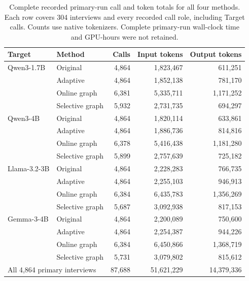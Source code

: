 \documentclass{ieeeaccess}
\begin{document}
\renewcommand{\thetable}{S6b}
\begin{table}[H]
\centering
\footnotesize
\caption{Complete recorded primary-run call and token totals for all four methods. Each row covers 304 interviews and every recorded call role, including Target calls. Counts use native tokenizers. Complete primary-run wall-clock time and GPU-hours were not retained.}
\label{tab:primary-resource-totals}
\begin{tabular*}{\textwidth}{@{\extracolsep{\fill}}llrrr@{}}
\toprule
Target & Method & Calls & Input tokens & Output tokens \\
\midrule
Qwen3-1.7B & Original & 4,864 & 1,823,467 & 611,251 \\
 & Adaptive & 4,864 & 1,852,138 & 781,170 \\
 & Online graph & 6,381 & 5,335,711 & 1,171,252 \\
 & Selective graph & 5,932 & 2,731,735 & 694,297 \\
Qwen3-4B & Original & 4,864 & 1,820,114 & 633,861 \\
 & Adaptive & 4,864 & 1,886,736 & 814,816 \\
 & Online graph & 6,378 & 5,416,438 & 1,181,280 \\
 & Selective graph & 5,899 & 2,757,639 & 725,182 \\
Llama-3.2-3B & Original & 4,864 & 2,228,283 & 766,735 \\
 & Adaptive & 4,864 & 2,255,103 & 946,913 \\
 & Online graph & 6,384 & 6,435,783 & 1,356,269 \\
 & Selective graph & 5,687 & 3,092,938 & 817,153 \\
Gemma-3-4B & Original & 4,864 & 2,200,089 & 750,600 \\
 & Adaptive & 4,864 & 2,254,387 & 944,226 \\
 & Online graph & 6,384 & 6,450,866 & 1,368,719 \\
 & Selective graph & 5,731 & 3,079,802 & 815,612 \\
\multicolumn{2}{l}{All 4,864 primary interviews} & 87,688 & 51,621,229 & 14,379,336 \\
\bottomrule
\end{tabular*}
\end{table}
\end{document}
